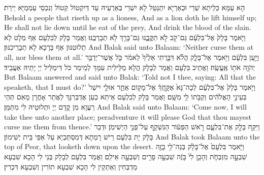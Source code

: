 {הָא עַמָּא כְּלֵיתָא שְׁרֵי וּכְאַרְיָא יִתְנַטַּל לָא יִשְׁרֵי בְּאַרְעֵיהּ עַד דְּיִקְטוֹל קְטוֹל וְנִכְסֵי עַמְמַיָּא יֵירַת׃}
{Behold a people that riseth up as a lioness, And as a lion doth he lift himself up; He shall not lie down until he eat of the prey, And drink the blood of the slain.}{}
{וַיֹּ֤אמֶר בָּלָק֙ אֶל־בִּלְעָ֔ם גַּם־קֹ֖ב לֹ֣א תִקֳּבֶ֑נּוּ גַּם־בָּרֵ֖ךְ לֹ֥א תְבָרְכֶֽנּוּ׃
}
{וַאֲמַר בָּלָק לְבִלְעָם אַף מְלָט לָא תְלוּטִנּוּן אַף בָּרָכָא לָא תְבָרֵיכִנּוּן׃}
{And Balak said unto Balaam: ‘Neither curse them at all, nor bless them at all.’}{}
{וַיַּ֣עַן בִּלְעָ֔ם וַיֹּ֖אמֶר אֶל־בָּלָ֑ק הֲלֹ֗א דִּבַּ֤רְתִּי אֵלֶ֙יךָ֙ לֵאמֹ֔ר כֹּ֛ל אֲשֶׁר־יְדַבֵּ֥ר יְהֹוָ֖ה אֹת֥וֹ אֶֽעֱשֶֽׂה׃}
{וַאֲתֵיב בִּלְעָם וַאֲמַר לְבָלָק הֲלָא מַלֵּילִית עִמָּךְ לְמֵימַר כֹּל דִּימַלֵּיל יְיָ יָתֵיהּ אַעֲבֵיד׃}
{But Balaam answered and said unto Balak: ‘Told not I thee, saying: All that the \lord\space speaketh, that I must do?’}{}
{וַיֹּ֤אמֶר בָּלָק֙ אֶל־בִּלְעָ֔ם לְכָה־נָּא֙ אֶקָּ֣חֲךָ֔ אֶל־מָק֖וֹם אַחֵ֑ר אוּלַ֤י יִישַׁר֙ בְּעֵינֵ֣י הָאֱלֹהִ֔ים וְקַבֹּ֥תוֹ לִ֖י מִשָּֽׁם׃
}
{וַאֲמַר בָּלָק לְבִלְעָם אֵיתַא כְעַן אֶדְבְּרִנָּךְ לַאֲתַר אָחֳרָן מָאִם תְּהֵי רַעֲוָא מִן קֳדָם יְיָ וּתְלוּטֵיהּ לִי מִתַּמָּן׃}
{And Balak said unto Balaam: ‘Come now, I will take thee unto another place; peradventure it will please God that thou mayest curse me them from thence.’}{}
{וַיִּקַּ֥ח בָּלָ֖ק אֶת־בִּלְעָ֑ם רֹ֣אשׁ הַפְּע֔וֹר הַנִּשְׁקָ֖ף עַל־פְּנֵ֥י הַיְשִׁימֹֽן׃
}
{וּדְבַר בָּלָק יָת בִּלְעָם רֵישׁ רָמְתָא דְּמִסְתַּכְיָא עַל אַפֵּי בֵּית יְשִׁימוֹן׃}
{And Balak took Balaam unto the top of Peor, that looketh down upon the desert.}{}
{וַיֹּ֤אמֶר בִּלְעָם֙ אֶל־בָּלָ֔ק בְּנֵה־לִ֥י בָזֶ֖ה שִׁבְעָ֣ה מִזְבְּחֹ֑ת וְהָכֵ֥ן לִי֙ בָּזֶ֔ה שִׁבְעָ֥ה פָרִ֖ים וְשִׁבְעָ֥ה אֵילִֽם׃}
{וַאֲמַר בִּלְעָם לְבָלָק בְּנֵי לִי הָכָא שִׁבְעָא מַדְבְּחִין וְאַתְקֵין לִי הָכָא שִׁבְעָא תוֹרִין וְשִׁבְעָא דִּכְרִין׃}
